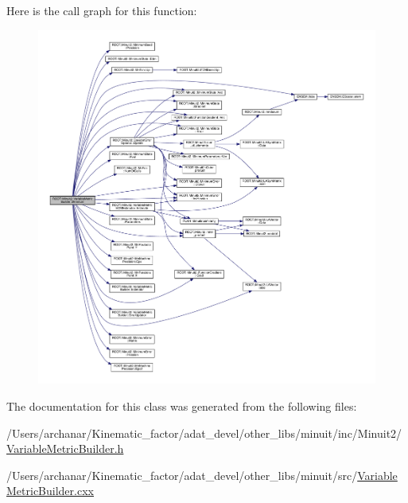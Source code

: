 Here is the call graph for this function\+:\nopagebreak
\begin{figure}[H]
\begin{center}
\leavevmode
\includegraphics[width=350pt]{d5/d52/classROOT_1_1Minuit2_1_1VariableMetricBuilder_a6214271e1802f110e94725295f3900fc_cgraph}
\end{center}
\end{figure}


The documentation for this class was generated from the following files\+:\begin{DoxyCompactItemize}
\item 
/\+Users/archanar/\+Kinematic\+\_\+factor/adat\+\_\+devel/other\+\_\+libs/minuit/inc/\+Minuit2/\mbox{\hyperlink{other__libs_2minuit_2inc_2Minuit2_2VariableMetricBuilder_8h}{Variable\+Metric\+Builder.\+h}}\item 
/\+Users/archanar/\+Kinematic\+\_\+factor/adat\+\_\+devel/other\+\_\+libs/minuit/src/\mbox{\hyperlink{VariableMetricBuilder_8cxx}{Variable\+Metric\+Builder.\+cxx}}\end{DoxyCompactItemize}
